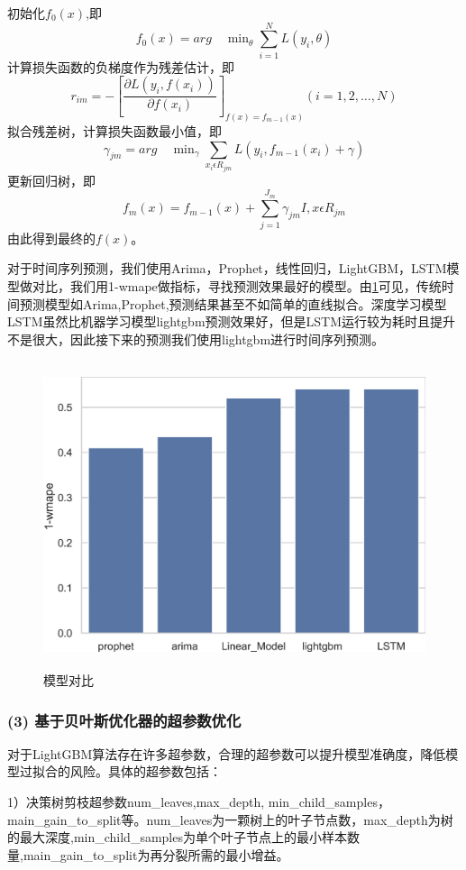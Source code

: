 \documentclass[withoutpreface,bwprint]{cumcmthesis}
\begin{document}
    初始化$f_0(x)$,即
  $$f_0(x)=arg\quad\min\nolimits_{\theta}\sum_{i=1}^{N}L(y_i,\theta)$$
    计算损失函数的负梯度作为残差估计，即
    $$r_{im}=-[\frac{\partial L(y_i,f(x_i))}{\partial f(x_i)}]_{f(x)=f_{m-1}(x)}  (i=1,2,\dots,N)$$
    拟合残差树，计算损失函数最小值，即
    $$\gamma_{jm}=arg\quad\min\nolimits_{\gamma} \sum\limits_{x_i \epsilon R_{jm}} L(y_i,f_{m-1}(x_i)+\gamma)$$
    更新回归树，即
    $$f_m(x)=f_{m-1}(x)+\sum\limits_{j=1}^{J_m}\gamma_{jm}I,x\epsilon R_{jm}$$
    由此得到最终的$f(x)$。

     对于时间序列预测，我们使用Arima，Prophet，线性回归，LightGBM，LSTM模型做对比，我们用1-wmape做指标，寻找预测效果最好的模型。由\ref{模型对比}可见，传统时间预测模型如Arima,Prophet,预测结果甚至不如简单的直线拟合。深度学习模型LSTM虽然比机器学习模型lightgbm预测效果好，但是LSTM运行较为耗时且提升不是很大，因此接下来的预测我们使用lightgbm进行时间序列预测。
      
     \begin{figure}[htbp]
     \centering
     \includegraphics[width=15cm,height=9cm]{figure/模型对比.png}%
     \caption{模型对比}
     \label{模型对比}
    \end{figure}
    
  \subsubsection*{(3) 基于贝叶斯优化器的超参数优化}

  对于LightGBM算法存在许多超参数，合理的超参数可以提升模型准确度，降低模型过拟合的风险。具体的超参数包括：
  
     1）决策树剪枝超参数num\_leaves,max\_depth,
min\_child\_samples，main\_gain\_to\_split等。num\_leaves为一颗树上的叶子节点数，max\_depth为树的最大深度,min\_child\_samples为单个叶子节点上的最小样本数量,main\_gain\_to\_split为再分裂所需的最小增益。
\end{document}
